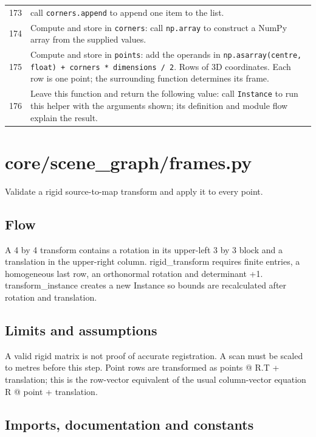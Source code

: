 \documentclass[11pt,a4paper]{book}
\begin{document}
\begin{longtable}{r p{}}
173 & call \texttt{corners.append} to append one item to the list. \\

174 & Compute and store in \texttt{corners}: call \texttt{np.array} to construct a NumPy array from the supplied values.  \\

175 & Compute and store in \texttt{points}: add the operands in \texttt{np.asarray(centre, float) + corners * dimensions / 2}. Rows of 3D coordinates. Each row is one point; the surrounding function determines its frame. \\

176 & Leave this function and return the following value: call \texttt{Instance} to run this helper with the arguments shown; its definition and module flow explain the result. \\

\end{longtable}

\chapter{core/scene\_graph/frames.py}

Validate a rigid source-to-map transform and apply it to every point.

\section*{Flow}

A 4 by 4 transform contains a rotation in its upper-left 3 by 3 block and a translation in the upper-right column. rigid\_transform requires finite entries, a homogeneous last row, an orthonormal rotation and determinant +1. transform\_instance creates a new Instance so bounds are recalculated after rotation and translation.

\section*{Limits and assumptions}

A valid rigid matrix is not proof of accurate registration. A scan must be scaled to metres before this step. Point rows are transformed as points @ R.T + translation; this is the row-vector equivalent of the usual column-vector equation R @ point + translation.

\section{Imports, documentation and constants}
\end{document}
